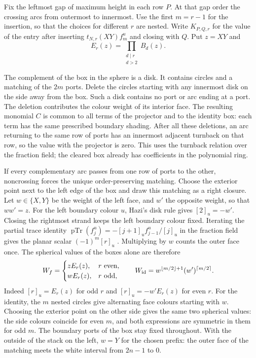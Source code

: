 Fix the leftmost gap of maximum height in each row \(P\). At that
gap order the crossing arcs from outermost to innermost. Use the
first \(m=r-1\) for the insertion, so that the choices for different
\(r\) are nested. Write \(K_{P,Q,r}\) for the value of the entry
after inserting \(t_{N,r}(XY)f^u_m\) and closing with \(Q\).
Put \(z=XY\) and
\[
                 E_r(z)=\prod_{\substack{d\mid r\\ d>2}} B_d(z).
\]

The complement of the box in the sphere is a disk. It contains
circles and a matching of the \(2m\) ports. Delete the circles starting
with any innermost disk on the side away from the box. Such a disk
contains no port or arc ending at a port. The deletion contributes
the colour weight of its interior face. The resulting monomial \(C\)
is common to all terms of the projector and to the identity box:
each term has the same prescribed boundary shading. After all these
deletions, an arc returning to the same row of ports has an innermost
adjacent turnback on that row, so the value with the projector is
zero. This uses the turnback relation over the fraction field;
the cleared box already has coefficients in the polynomial ring.

If every complementary arc passes from one row of ports to the other,
noncrossing forces the unique order-preserving matching. Choose
the exterior point next to the left edge of the box and draw this
matching as a right closure. Let \(w\in\{X,Y\}\) be the weight of the
left face, and \(w'\) the opposite weight, so that \(ww'=z\).
For the left boundary colour \(u\), Hazi's disk rule gives
\([2]_u=-w'\). Closing the rightmost strand keeps the left boundary
colour fixed. Iterating the partial trace identity
\(\operatorname{pTr}(f_j^u)=-[j+1]_u f_{j-1}^u/[j]_u\)
in the fraction field gives the planar scalar \((-1)^m[r]_u\)
\cite[equation (7)]{hazi}. Multiplying by \(w\) counts the outer
face once. The spherical values of the boxes alone are therefore
\[
 W_f=
 \begin{cases}
       z E_r(z),&r\ \text{even},\\
       w E_r(z),&r\ \text{odd},
 \end{cases}
 \qquad
 W_{\rm id}=w^{\lfloor m/2\rfloor+1}(w')^{\lceil m/2\rceil}.
\]
Indeed \([r]_u=E_r(z)\) for odd \(r\) and
\([r]_u=-w' E_r(z)\) for even \(r\). For the identity, the \(m\)
nested circles give alternating face colours starting with \(w\).
Choosing the exterior point on the other side gives the same two
spherical values: the side colours coincide for even \(m\), and both
expressions are symmetric in them for odd \(m\). The boundary ports
of the box stay fixed throughout. With the outside of the stack on
the left, \(w=Y\) for the chosen prefix: the outer face of the
matching meets the white interval from \(2n-1\) to \(0\).


